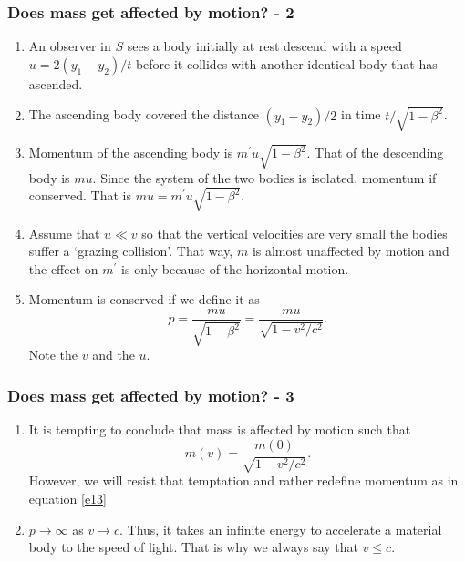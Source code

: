 \documentclass{beamer}
\begin{document}
\begin{frame}
\frametitle{Does mass get affected by motion? - 2}
\begin{enumerate}
\item An observer in $S$ sees a body initially at rest descend with a speed 
$u = 2(y_1 - y_2)/t$ before it collides with another identical body that has
ascended.
\item The ascending body covered the distance $(y_1 - y_2)/2$ in time 
$t/\sqrt{1 - \beta^2}$. 
\item Momentum of the ascending body is $m^\prime u\sqrt{1 - \beta^2}$. That of 
the descending body is $mu$. Since the system of the two bodies is isolated, 
momentum if conserved. That is $mu = m^\prime u\sqrt{1 - \beta^2}$.
\item Assume that $u \ll v$ so that the vertical velocities are very small the
bodies suffer a `grazing collision'. That way, $m$ is almost unaffected by 
motion and the effect on $m^\prime$ is only because of the horizontal motion.
\item Momentum is conserved if we define it as
\begin{equation}\label{e13}
p = \frac{mu}{\sqrt{1 - \beta^2}} = \frac{mu}{\sqrt{1 - v^2/c^2}} .
\end{equation}
Note the $v$ and the $u$.
\end{enumerate}
\end{frame}

\begin{frame}
\frametitle{Does mass get affected by motion? - 3}
\begin{enumerate}
\item It is tempting to conclude that mass is affected by motion such that
\begin{equation}\label{e14}
m(v) = \frac{m(0)}{\sqrt{1 - v^2/c^2}}.
\end{equation}
However, we will resist that temptation and rather redefine momentum as in
equation \eqref{e13}
\item $p \rightarrow \infty$ as $v \rightarrow c$. Thus, it takes an infinite
energy to accelerate a material body to the speed of light. That is why we
always say that $v \le c$. 
\end{enumerate}
\end{frame}
\end{document}
